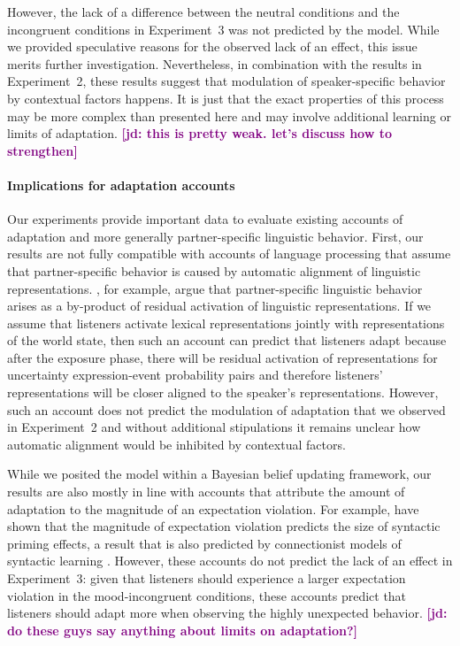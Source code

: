 \documentclass[man,floatsintext]{apa6}
\newcommand{\jd}[1]{\textcolor{Purple}{\bf [jd: #1]}}
\begin{document}
However, the lack of a difference between the neutral conditions and the incongruent conditions in Experiment~3 was not predicted by the model. While we provided speculative reasons for the observed lack of an effect, this issue merits further investigation. Nevertheless, in combination with the results in Experiment~2,  these results suggest that modulation of speaker-specific behavior by contextual factors happens. It is just that the exact properties of this process may be more complex than presented here and may involve additional learning or limits of adaptation. \jd{this is pretty weak. let's discuss how to strengthen}


\paragraph{Implications for adaptation accounts} Our experiments provide important data to evaluate existing accounts of adaptation and more generally partner-specific linguistic behavior. First, our results are not fully compatible with accounts of language processing that assume that partner-specific behavior is caused by automatic alignment of linguistic representations. , for example, argue that partner-specific linguistic behavior arises as a by-product of residual activation of linguistic representations. If we assume 
that listeners activate lexical representations jointly with representations of the world state, then such an account can predict that listeners adapt because after the exposure phase, there will be residual activation of representations for uncertainty expression-event probability pairs and therefore listeners' representations will be closer aligned to the speaker's representations. However, such an account does not predict the modulation of adaptation that we observed in Experiment~2 and without additional stipulations it remains unclear how automatic alignment would be inhibited by contextual factors.

While we posited the model within a Bayesian belief updating framework, our results are also mostly in line with accounts that attribute the amount of adaptation to the magnitude of an expectation violation. For example,   have shown that the magnitude of expectation violation predicts the size of syntactic priming effects, a result that is also predicted by connectionist models of syntactic learning \cite{Chang2006}. However, these accounts do not predict the lack of an effect in Experiment~3: given that listeners should experience a larger expectation violation in the mood-incongruent conditions, these accounts predict that listeners should adapt more when observing the highly unexpected behavior. \jd{do these guys say anything about limits on adaptation?}
\end{document}

